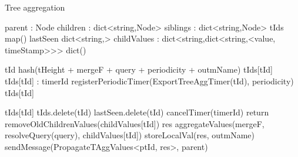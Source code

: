 \begin{algorithm}
\caption{Tree aggregation} \label{alg:mon:tree_agg}
\begin{algorithmic}[1]

    \asdstate \label{alg:mon:tree_agg:state}
        \State parent : Node  
        \State children : dict<string,Node>  
        \State siblings : dict<string,Node>   
        \State tIds \asdassign map()
        \State lastSeen \asdassign dict<string,>
        \State childValues : dict<string,dict<string,<value, timeStamp>>> \asdassign dict()
    \asdend

    \label{alg:mon:tree_agg:start_req}
        \State tId \asdassign hash(tHeight + mergeF + query + periodicity + outmName) \label{alg:mon:tree_agg:start_req_start}
            \State <tHeight, mergeF, query, periodicity, outmName, timerId, isLocal, isParentSub, ptId> \asdassign tIds[tId]
            \State tIds[tId] \asdassign <tHeight, mergeF, query, periodicity, outmName, timerId, true, isParentSub, ptId>
        \Else:
        \State timerId \asdassign registerPeriodicTimer(ExportTreeAggTimer(tId), periodicity)
        \State tIds[tId] \asdassign <tHeight, mergeF, query, periodicity, outmName, timerId, true, false, nil>
        \EndIf\label{alg:mon:tree_agg:start_req_end}
    \asdend

     \label{alg:mon:tree_agg:export_trigger}
        \State <tHeight, mergeF, query, periodicity, outmName, timerId, isLocal, isParentSub, ptId> \asdassign tIds[tId]
                \State tIds.delete(tId)
                \State lastSeen.delete(tId)
                \State cancelTimer(timerId)
                \State return
            \EndIf
        \EndIf
        \State removeOldChildrenValues(childValues[tId])
        \State res \asdassign aggregateValues(mergeF, resolveQuery(query), childValues[tId])
            \State storeLocalVal(res, outmName)
        \EndIf 
            \State sendMessage(PropagateTAggValues<ptId, res>, parent)
        \EndIf
    \asdend


\end{algorithmic}
\end{algorithm}
